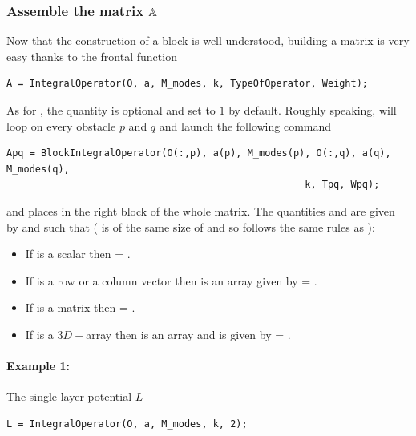 \subsubsection{Assemble the matrix ${\mathbb{A}}$}
\label{secFun:IntegralOperator}

Now that the construction of a block is well understood, building a matrix is very easy thanks to the frontal function
\begin{lstlisting}
A = IntegralOperator(O, a, M_modes, k, TypeOfOperator, Weight);
\end{lstlisting}
As for \BlockIntegralOperator, the quantity  is optional and set to $1$ by default. Roughly speaking, \IntegralOperator will loop on every obstacle $p$ and $q$ and launch the following command
\begin{lstlisting}
Apq = BlockIntegralOperator(O(:,p), a(p), M_modes(p), O(:,q), a(q), M_modes(q), 
                                                    k, Tpq, Wpq);
\end{lstlisting}
and places  in the right block of the whole matrix. The quantities  and  are given by  and  such that ( is of the same size of  and so  follows the same rules as ):
\begin{itemize}
\item If  is a scalar then  = . 
\item If  is a row or a column vector then  is an array given by  = . 
\item If  is a matrix then  = . 
\item If  is a $3D-$array then  is an array and is given by  = . 
\end{itemize}
%


\paragraph{Example 1:} The single-layer potential $L$
\begin{lstlisting}
L = IntegralOperator(O, a, M_modes, k, 2);
\end{lstlisting}
